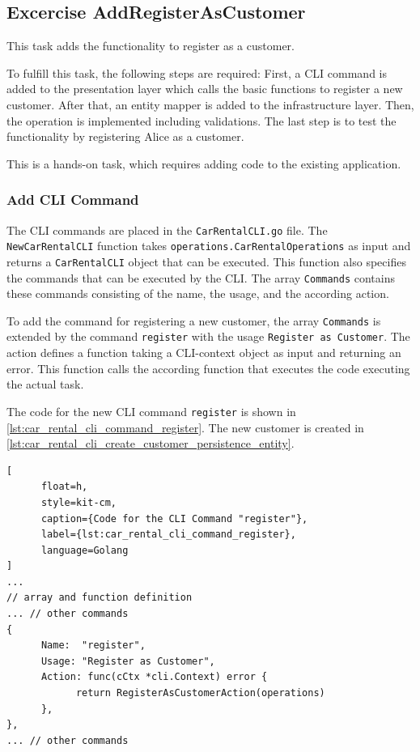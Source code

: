\subsection{Excercise AddRegisterAsCustomer}
\label{sec:exercise_add_register_as_customer}
This task adds the functionality to register as a customer.

To fulfill this task, the following steps are required:
First, a CLI command is added to the presentation layer which calls the basic functions to register a new customer.
After that, an entity mapper is added to the infrastructure layer.
Then, the operation is implemented including validations.
The last step is to test the functionality by registering Alice as a customer.

This is a hands-on task, which requires adding code to the existing application.

\subsubsection*{Add CLI Command}
The CLI commands are placed in the \texttt{CarRentalCLI.go} file.
The \texttt{NewCarRentalCLI} function takes \texttt{operations.CarRentalOperations} as input and returns a \texttt{CarRentalCLI} object that can be executed.
This function also specifies the commands that can be executed by the CLI.
The array \texttt{Commands} contains these commands consisting of the name, the usage, and the according action.

To add the command for registering a new customer, the array \texttt{Commands} is extended by the command \texttt{register} with the usage \texttt{Register as Customer}.
The action defines a function taking a CLI-context object as input and returning an error.
This function calls the according function that executes the code executing the actual task.

The code for the new CLI command \texttt{register} is shown in \autoref{lst:car_rental_cli_command_register}.
The new customer is created in \autoref{lst:car_rental_cli_create_customer_persistence_entity}.

\begin{lstlisting}[
      float=h,
      style=kit-cm,
      caption={Code for the CLI Command "register"},
      label={lst:car_rental_cli_command_register},
      language=Golang
]
...
// array and function definition
... // other commands
{
      Name:  "register",
      Usage: "Register as Customer",
      Action: func(cCtx *cli.Context) error {
            return RegisterAsCustomerAction(operations)
      },
},
... // other commands
\end{lstlisting}

